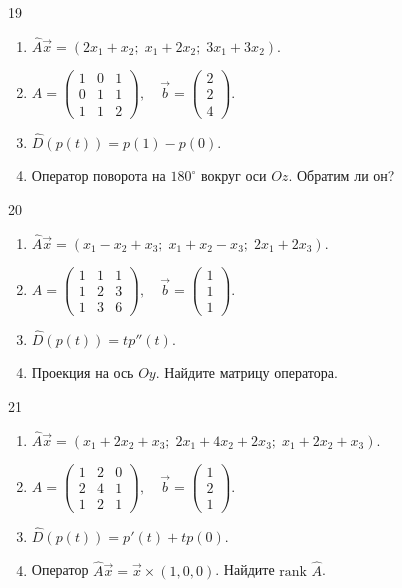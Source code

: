 \documentclass[12pt,a4paper]{article}
\theoremstyle{plain}
\theoremstyle{definition}
\begin{document}
\begin{taskbox}{19}
    \begin{enumerate}
        \item $\hat{A}\vec{x} = (2x_1 + x_2; \; x_1 + 2x_2; \; 3x_1 + 3x_2)$.
        \item $A = \begin{pmatrix} 1 & 0 & 1 \\ 0 & 1 & 1 \\ 1 & 1 & 2 \end{pmatrix}, \quad \vec{b} = \begin{pmatrix} 2 \\ 2 \\ 4 \end{pmatrix}$.
        \item $\hat{D}(p(t)) = p(1) - p(0)$.
        \item Оператор поворота на $180^\circ$ вокруг оси $Oz$. Обратим ли он?
    \end{enumerate}
\end{taskbox}

\begin{taskbox}{20}
    \begin{enumerate}
        \item $\hat{A}\vec{x} = (x_1 - x_2 + x_3; \; x_1 + x_2 - x_3; \; 2x_1 + 2x_3)$.
        \item $A = \begin{pmatrix} 1 & 1 & 1 \\ 1 & 2 & 3 \\ 1 & 3 & 6 \end{pmatrix}, \quad \vec{b} = \begin{pmatrix} 1 \\ 1 \\ 1 \end{pmatrix}$.
        \item $\hat{D}(p(t)) = t p''(t)$.
        \item Проекция на ось $Oy$. Найдите матрицу оператора.
    \end{enumerate}
\end{taskbox}

\begin{taskbox}{21}
    \begin{enumerate}
        \item $\hat{A}\vec{x} = (x_1 + 2x_2 + x_3; \; 2x_1 + 4x_2 + 2x_3; \; x_1 + 2x_2 + x_3)$.
        \item $A = \begin{pmatrix} 1 & 2 & 0 \\ 2 & 4 & 1 \\ 1 & 2 & 1 \end{pmatrix}, \quad \vec{b} = \begin{pmatrix} 1 \\ 2 \\ 1 \end{pmatrix}$.
        \item $\hat{D}(p(t)) = p'(t) + t p(0)$.
        \item Оператор $\hat{A}\vec{x} = \vec{x} \times (1,0,0)$. Найдите $\text{rank } \hat{A}$.
    \end{enumerate}
\end{taskbox}
\end{document}
